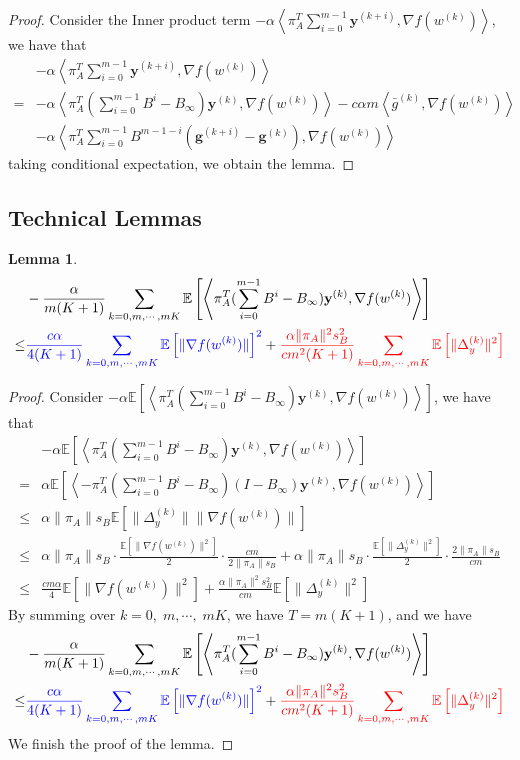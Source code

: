\documentclass{article}
\newtheorem{lemma}[thm]{Lemma}
\newcommand{\vg}{{\mathbf{g}}}
\newcommand{\vy}{{\mathbf{y}}}
\newcommand{\EE}[1]{\mathbb{E}\left[#1\right]}
\newcommand{\norm}[1]{\| #1 \|}
\newcommand{\ip}[1]{\left\langle#1\right\rangle}
\begin{document}
\begin{proof}
  Consider the Inner product term $-\alpha\ip{\pi_A^T\sum_{i=0}^{m-1}\vy^{(k+i)},\nabla f(w^{(k)})}$, we have that 
\begin{align*}
  &-\alpha\ip{\pi_A^T\sum_{i=0}^{m-1}\vy^{(k+i)},\nabla f(w^{(k)})}\\
  =&-\alpha\ip{\pi_A^T(\sum_{i=0}^{m-1}B^i-B_{\infty}) \vy^{(k)},\nabla f(w^{(k)})}-c\alpha m\ip{\bar{g}^{(k)},\nabla f(w^{(k)})}\\&-\alpha\ip{\pi_A^T\sum_{i=0}^{m-1}B^{m-1-i}(\vg^{(k+i)}-\vg^{(k)}),\nabla f(w^{(k)})}
\end{align*}
taking conditional expectation, we obtain the lemma.
\end{proof}

\subsection{Technical Lemmas}
\begin{lemma}
  \begin{align*}
    &-\frac{\alpha}{m(K+1)}\sum_{k=0,m,\cdots,mK}\EE{\ip{\pi_A^T(\sum_{i=0}^{m-1}B^i-B_{\infty}) \vy^{(k)},\nabla f(w^{(k)})}}\\ \leq& \textcolor{blue}{\frac{c\alpha}{4(K+1)}\sum_{k=0,m,\cdots,mK}\EE{\norm{\nabla f(w^{(k)})}}^2}+\textcolor{red}{\frac{\alpha\norm{\pi_A}^2s_B^2}{cm^2(K+1)}\sum_{k=0,m,\cdots,mK}\EE{\norm{\Delta_y^{(k)}}^2}}
  \end{align*}
\end{lemma}

\begin{proof}
  Consider $-\alpha\EE{\ip{\pi_A^T(\sum_{i=0}^{m-1}B^i-B_{\infty}) \vy^{(k)},\nabla f(w^{(k)})}}$, we have that 
  \begin{align*}
    &-\alpha\EE{\ip{\pi_A^T(\sum_{i=0}^{m-1}B^i-B_{\infty}) \vy^{(k)},\nabla f(w^{(k)})}}\\
    =&\alpha\EE{\ip{-\pi_A^T(\sum_{i=0}^{m-1}B^i-B_{\infty})(I-B_{\infty}) \vy^{(k)},\nabla f(w^{(k)})}}\\ 
    \leq&\alpha\norm{\pi_A}s_B \EE{\norm{\Delta_y^{(k)}}\norm{\nabla f(w^{(k)})}}\\ \leq & \alpha \norm{\pi_A}s_B \cdot \frac{\EE{\norm{\nabla f(w^{(k)})}^2}}{2}\cdot \frac{cm}{2\norm{\pi_A}s_B}+\alpha \norm{\pi_A}s_B \cdot \frac{\EE{\norm{\Delta_y^{(k)}}^2}}{2}\cdot \frac{2\norm{\pi_A}s_B}{cm}\\
    \leq& \frac{cm\alpha}{4}\EE{\norm{\nabla f(w^{(k)})}^2}+\frac{\alpha\norm{\pi_A}^2s_B^2}{cm}\EE{\norm{\Delta_y^{(k)}}^2}
  \end{align*}
  By summing over $k=0,\;m,\cdots,\;mK$, we have $T=m(K+1)$, and we have
  \begin{align*}
    &-\frac{\alpha}{m(K+1)}\sum_{k=0,m,\cdots,mK}\EE{\ip{\pi_A^T(\sum_{i=0}^{m-1}B^i-B_{\infty}) \vy^{(k)},\nabla f(w^{(k)})}}\\ \leq& \textcolor{blue}{\frac{c\alpha}{4(K+1)}\sum_{k=0,m,\cdots,mK}\EE{\norm{\nabla f(w^{(k)})}}^2}+\textcolor{red}{\frac{\alpha\norm{\pi_A}^2s_B^2}{cm^2(K+1)}\sum_{k=0,m,\cdots,mK}\EE{\norm{\Delta_y^{(k)}}^2}}
  \end{align*}
  We finish the proof of the lemma.
\end{proof}
\end{document}
